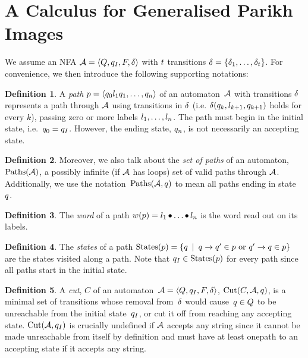\documentclass[acmsmall,review,anonymous,screen]{acmart}\settopmatter{printfolios=true,printccs=false,printacmref=true}
\theoremstyle{definition}
\newtheorem{definition}{Definition}[section]
\begin{document}
\section{A Calculus for Generalised Parikh Images}\label{sec:calculus}

We assume an NFA $\mathcal{A} = \left\langle Q, q_I, F, \delta\right\rangle$ with $t$
transitions $\delta =
\left\{\delta_{1} , \ldots , \delta_{t}\right\}$. For convenience, we then introduce the following supporting notations:

\begin{definition}
  A \textit{path} $p = \left\langle q_0 l_1 q_1 , \ldots , q_n\right\rangle$ of an automaton~$\mathcal{A}$ with
  transitions $\delta$ represents a path through $\mathcal{A}$ using
  transitions in $\delta$ (i.e. $\delta(q_k, l_{k+1},
  q_{k+1})$ holds for every $k$), passing zero or more labels $l_1,
  \ldots, l_n$. The path must begin in the initial state, i.e.~$q_0 =
  q_I$. However, the ending state, $q_n$, is not necessarily an
  accepting state.
  \end{definition}

\begin{definition}
  Moreover, we also talk about the \textit{set of paths} of an automaton,
  $\operatorname{Paths}(\mathcal{A})$, a possibly infinite (if $\mathcal{A}$ has loops) set of
  valid paths through $\mathcal{A}$. Additionally, we use the
  notation~$\operatorname{Paths}(\mathcal{A}, q)$ to mean all paths ending in
  state~$q$.
\end{definition}

\begin{definition}
  The \textit{word} of a path $w(p) = l_1 \operatorname{\bullet} \ldots \operatorname{\bullet} l_n$ is
  the word read out on its labels.
\end{definition}

\begin{definition}
  The \textit{states} of a path $\operatorname{States}(p) = \left\{q \:\mid\:
  q \xrightarrow{} q' \in p \text{ or }
  q' \xrightarrow{} q \in p\right\}$ are the states visited along a
  path. Note that $q_I \in \operatorname{States}(p)$ for every path since all
  paths start in the initial state.
\end{definition}

\begin{definition}
  A \textit{cut}, $C$ of an automaton~$\mathcal{A} = \left\langle Q, q_I, F, \delta\right\rangle$,
  $\operatorname{Cut}(C, \mathcal{A}, q)$, is a minimal set of transitions whose
  removal from~$\delta$ would cause~$q \in Q$ to be unreachable
  from the initial state~$q_I$, or cut it off from reaching any
  accepting state. $\operatorname{Cut}(\mathcal{A}, q_I)$ is crucially
  undefined if $\mathcal{A}$ accepts any string since it cannot be made unreachable
  from itself by definition and must have at least onepath to an accepting state
  if it accepts any string.
\end{definition}
\end{document}
